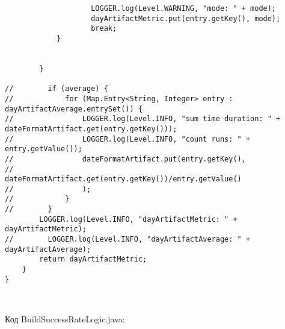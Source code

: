 \begin{lstlisting}
                    LOGGER.log(Level.WARNING, "mode: " + mode);
                    dayArtifactMetric.put(entry.getKey(), mode);
                    break;
            }


        }

//        if (average) {
//            for (Map.Entry<String, Integer> entry : dayArtifactAverage.entrySet()) {
//                LOGGER.log(Level.INFO, "sum time duration: " + dateFormatArtifact.get(entry.getKey()));
//                LOGGER.log(Level.INFO, "count runs: " + entry.getValue());
//                dateFormatArtifact.put(entry.getKey(),
//                        dateFormatArtifact.get(entry.getKey())/entry.getValue()
//                );
//            }
//        }
        LOGGER.log(Level.INFO, "dayArtifactMetric: " + dayArtifactMetric);
//        LOGGER.log(Level.INFO, "dayArtifactAverage: " + dayArtifactAverage);
        return dayArtifactMetric;
    }
}



\end{lstlisting}

Код BuildSuccessRateLogic.java:

